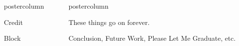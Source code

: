 \documentclass[xcolor={usenames,dvipsnames,svgnames,table}]{beamer}
\newlength{\columnheight}
\begin{document}
\begin{frame}
\begin{columns}
\begin{column}{.33\textwidth}
\begin{beamercolorbox}[center,wd=\textwidth]{postercolumn}
\begin{minipage}[T]{0.95\textwidth}
{			    %
			    \begin{block}{Credit}
			    \end{block}
			    \vfill
			    \begin{block}{Block}
		    	\vfill
			    \end{block}
			    \vfill
			}
			\end{minipage}
		\end{beamercolorbox}
	\end{column}

	\begin{column}{.33\textwidth}
		\begin{beamercolorbox}[center,wd=\textwidth]{postercolumn}
			\begin{minipage}[T]{0.95\textwidth} %
			\parbox[t][\columnheight]{\textwidth}{ %

			    \begin{block}{These things go on forever.}
			    \end{block}
			    \vfill
			    \begin{block}{Conclusion, Future Work, Please Let Me Graduate, etc.}
			    \end{block}
			    \vfill
			}
			\end{minipage}
		\end{beamercolorbox}
	\end{column}

	\end{columns}
\end{frame}
\end{document}
